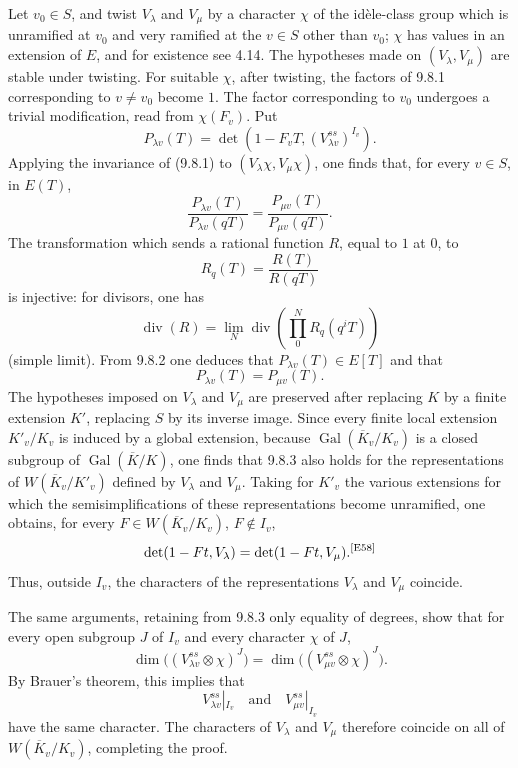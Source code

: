 \documentclass[10pt,letterpaper]{article}
\newcommand{\Gal}{\operatorname{Gal}}
\providecommand{\Gal}{\operatorname{Gal}}
\providecommand{\Gal}{\operatorname{Gal}}
\providecommand{\Gal}{\operatorname{Gal}}
\providecommand{\Gal}{\operatorname{Gal}}
\newcommand{\auditmark}[1]{\textsuperscript{\normalfont\scriptsize[E#1]}}
\begin{document}
Let $v_0\in S$, and twist $V_\lambda$ and $V_\mu$ by a character $\chi$ of the idèle-class group which is unramified at $v_0$ and very ramified at the $v\in S$ other than $v_0$; $\chi$ has values in an extension of $E$, and for existence see 4.14. The hypotheses made on $(V_\lambda,V_\mu)$ are stable under twisting. For suitable $\chi$, after twisting, the factors of 9.8.1 corresponding to $v\ne v_0$ become $1$. The factor corresponding to $v_0$ undergoes a trivial modification, read from $\chi(F_v)$. Put
\[
P_{\lambda v}(T)=\det(1-F_vT,(V_{\lambda v}^{ss})^{I_v}).
\]
Applying the invariance of (9.8.1) to $(V_\lambda\chi,V_\mu\chi)$, one finds that, for every $v\in S$, in $E(T)$,
\[
\tag{9.8.2}
\frac{P_{\lambda v}(T)}{P_{\lambda v}(qT)}=
\frac{P_{\mu v}(T)}{P_{\mu v}(qT)}.
\]
The transformation which sends a rational function $R$, equal to $1$ at $0$, to
\[
R_q(T)=\frac{R(T)}{R(qT)}
\]
is injective: for divisors, one has
\[
\operatorname{div}(R)=\lim_N \operatorname{div}\left(\prod_{0}^{N}R_q(q^iT)\right)
\]
(simple limit). From 9.8.2 one deduces that $P_{\lambda v}(T)\in E[T]$ and that
\[
\tag{9.8.3}
P_{\lambda v}(T)=P_{\mu v}(T).
\]
The hypotheses imposed on $V_\lambda$ and $V_\mu$ are preserved after replacing $K$ by a finite extension $K'$, replacing $S$ by its inverse image. Since every finite local extension $K'_v/K_v$ is induced by a global extension, because $\Gal(\overline K_v/K_v)$ is a closed subgroup of $\Gal(\overline K/K)$, one finds that 9.8.3 also holds for the representations of $W(\overline K_v/K'_v)$ defined by $V_\lambda$ and $V_\mu$. Taking for $K'_v$ the various extensions for which the semisimplifications of these representations become unramified, one obtains, for every $F\in W(\overline K_v/K_v)$, $F\notin I_v$,
\[
\det(1-Ft,V_\lambda)=\det(1-Ft,V_\mu).\auditmark{58}
\]
Thus, outside $I_v$, the characters of the representations $V_\lambda$ and $V_\mu$ coincide.

The same arguments, retaining from 9.8.3 only equality of degrees, show that for every open subgroup $J$ of $I_v$ and every character $\chi$ of $J$,
\[
\dim\bigl((V_{\lambda v}^{ss}\otimes\chi)^J\bigr)
=
\dim\bigl((V_{\mu v}^{ss}\otimes\chi)^J\bigr).
\]
By Brauer's theorem, this implies that
\[
V_{\lambda v}^{ss}|_{I_v}\quad\text{and}\quad V_{\mu v}^{ss}|_{I_v}
\]
have the same character. The characters of $V_\lambda$ and $V_\mu$ therefore coincide on all of $W(\overline K_v/K_v)$, completing the proof.
\end{document}

